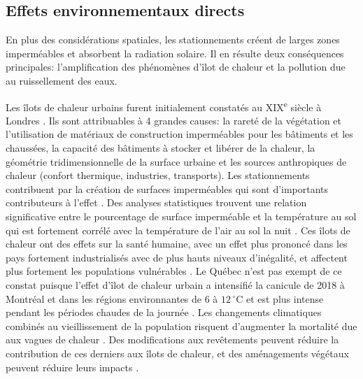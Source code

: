     \subsection{Effets environnementaux directs} \label{sec:effets-environnementaux}
        En plus des considérations spatiales,  les stationnements créent de larges zones imperméables et absorbent la radiation solaire. Il en résulte deux conséquences principales: l'amplification des phénomènes d'îlot de chaleur et la pollution due au ruissellement des eaux.\par
        Les îlots de chaleur urbains furent initialement constatés au XIX\textsuperscript{e} siècle à Londres \parencite{hidalgo_advances_2008,howard_climate_1833}. Ils sont attribuables à 4 grandes causes: la rareté de la végétation et l'utilisation de matériaux de construction imperméables pour les bâtiments et les chaussées, la capacité des bâtiments à stocker et libérer de la chaleur, la géométrie tridimensionnelle de la surface urbaine \fg{} et les sources anthropiques de chaleur (confort thermique, industries, transports). Les stationnements contribuent par la création de surfaces imperméables qui sont d'importants contributeurs à l'effet \parencite{dudorova_energy_2022}. Des analyses statistiques trouvent une relation significative entre le pourcentage de surface imperméable et la température au sol \parencite{buyantuyev_urban_2010,zhou_does_2011} qui est fortement corrélé avec la température de l'air au sol la nuit \parencite{sheng_impacts_2015,marzban_influence_2018}. Ces îlots de chaleur ont des effets sur la santé humaine, avec un effet plus prononcé dans les pays fortement industrialisés avec de plus hauts niveaux d'inégalité, et affectent plus fortement les populations vulnérables \parencite{yuan_unraveling_2024}. Le Québec n'est pas exempt de ce constat puisque l'effet d'îlot de chaleur urbain a intensifié la canicule de 2018 à Montréal et dans les régions environnantes de 6 à $12\,^\circ\mathrm{C}$ et est plus intense pendant les périodes chaudes de la journée \parencite{shu_evolution_2023}. Les changements climatiques combinés au vieillissement de la population risquent d'augmenter la mortalité due aux vagues de chaleur \parencite{cote_projected_2024,hebbern_future_2023}. Des modifications aux revêtements peuvent réduire la contribution de ces derniers aux îlots de chaleur\parencite{shamsaei_review_2022}, et des aménagements végétaux peuvent réduire leurs impacts \parencite{parison_effects_2023,chun_impact_2018,bouzouidja_experimental_2021}. \par
